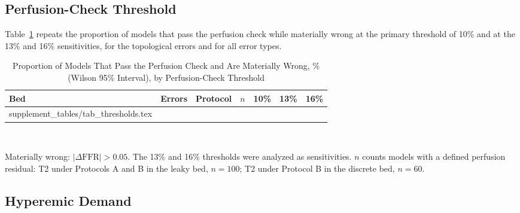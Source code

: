 \documentclass[journal,onecolumn,11pt]{IEEEtran}
\begin{document}
\subsection{Perfusion-Check Threshold}
Table~\ref{tab:thr} repeats the proportion of models that pass the perfusion check while materially wrong at the
primary threshold of 10\% and at the 13\% and 16\% sensitivities, for the topological errors and for all error
types.
\begin{table}[!ht]
\caption{Proportion of Models That Pass the Perfusion Check and Are Materially Wrong, \% (Wilson 95\% Interval), by
Perfusion-Check Threshold}\label{tab:thr}
\centering\small
\begin{tabular}{@{}lllrccc@{}}
\toprule
Bed & Errors & Protocol & $n$ & 10\% & 13\% & 16\%\\
\midrule
{} supplement_tables/tab_thresholds.tex 
\bottomrule
\end{tabular}
\\[3pt]
\parbox{0.85\textwidth}{\footnotesize Materially wrong: $|\Delta\mathrm{FFR}| > 0.05$. The 13\% and 16\% thresholds were analyzed as sensitivities. $n$ counts models with a
defined perfusion residual: T2 under Protocols A and B in the leaky bed, $n = 100$; T2 under Protocol B in the
discrete bed, $n = 60$.}
\end{table}

\FloatBarrier
\subsection{Hyperemic Demand}\label{sec:demand}


\FloatBarrier
\end{document}
